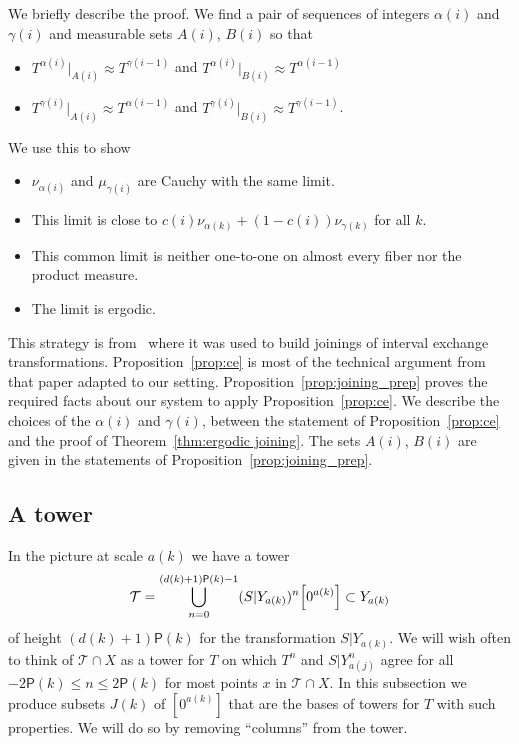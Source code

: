 \documentclass[AHL,Unicode,longabstracts,published]{cedram}
\renewcommand{\P}{\mathsf{P}}
\newcommand{\clT}{\mathcal{T}}
\let\originalleft\left
\let\originalright\right
\renewcommand{\left}{\mathopen{}\mathclose\bgroup\originalleft}
\renewcommand{\right}{\aftergroup\egroup\originalright}
\begin{document}
We briefly describe the proof. We find a pair of sequences of integers $\alpha(i)$ and $\gamma(i)$ and measurable sets $A(i)$, $B(i)$ so that
\begin{itemize}
\item $T^{\alpha(i)}|_{A(i)}\approx T^{\gamma(i-1)}$ and $T^{\alpha(i)}|_{B(i)} \approx T^{\alpha(i-1)} $
\item $T^{\gamma(i)}|_{A(i)}\approx T^{\alpha(i-1)}$ and $T^{\gamma(i)}|_{B(i)} \approx T^{\gamma(i-1)} $.
\end{itemize}
We use this to show
\begin{itemize}
\item $\nu_{\alpha(i)}$ and $\mu_{\gamma(i)}$ are Cauchy with the same limit.
\item This limit is close to $c(i) \nu_{\alpha(k)}+(1-c(i))\nu_{\gamma(k)}$ for all $k$.
\item This common limit is neither one-to-one on almost every fiber nor the product measure.
\item The limit is ergodic.
\end{itemize}
This strategy is from~\cite{MR4269425} where it was used to build joinings of interval exchange transformations. Proposition~\ref{prop:ce} is most of the technical argument from that paper adapted to our setting. Proposition~\ref{prop:joining_prep} proves the required facts about our system to apply Proposition~\ref{prop:ce}. We describe the choices of the $\alpha(i)$ and $\gamma(i)$, between the statement of Proposition~\ref{prop:ce} and the proof of Theorem~\ref{thm:ergodic joining}. The sets $A(i)$, $B(i)$ are given in the statements of Proposition~\ref{prop:joining_prep}.

\subsection{A tower}\label{subsec:two_toweres}

In the picture at scale $a(k)$ we have a tower
\[
\clT = \bigcup_{n=0}^{(d(k) + 1)\P(k)-1} (S|Y_{a(k)})^n \left[0^{a(k)}\right] \subset Y_{a(k)}
\]
of height $(d(k)+1) \P(k)$ for the transformation $S|Y_{a(k)}$. We will wish often to think of $\clT \cap X$ as a tower for $T$ on which $T^n$ and $S|Y_{a(j)}^n$ agree for all $-2 \P(k) \le n \le 2 \P(k)$ for most points $x$ in $\clT \cap X$. In this subsection we produce subsets $J(k)$ of $[0^{a(k)}]$ that are the bases of towers for $T$ with such properties. We will do so by removing ``columns'' from the tower.
\end{document}
